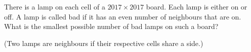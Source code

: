 There is a lamp on each cell of a $2017 \times 2017$ board. Each lamp is either on or off. A lamp is called bad if it has an even number of neighbours that are on. What is the smallest possible number of bad lamps on such a board?

(Two lamps are neighbours if their respective cells share a side.)